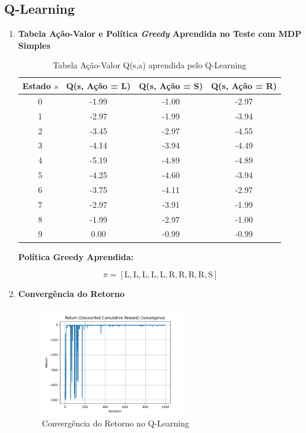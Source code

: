 \documentclass[a4paper,12pt]{article}
\begin{document}
\subsection{Q-Learning}
\begin{enumerate}[label=2.2.\arabic*.]
    \item \textbf{Tabela Ação-Valor e Política \textit{Greedy} Aprendida no Teste com MDP Simples}\\
    
    \begin{table}[h!]
    \centering
    \caption{Tabela Ação-Valor Q(s,a) aprendida pelo Q-Learning}
    \begin{tabular}{|c|c|c|c|}
    \hline
    \textbf{Estado $s$} & \textbf{Q(s, Ação = L)} & \textbf{Q(s, Ação = S)} & \textbf{Q(s, Ação = R)} \\
    \hline
    0 & -1.99 & -1.00 & -2.97 \\
    1 & -2.97 & -1.99 & -3.94 \\
    2 & -3.45 & -2.97 & -4.55 \\
    3 & -4.14 & -3.94 & -4.49 \\
    4 & -5.19 & -4.89 & -4.89 \\
    5 & -4.25 & -4.60 & -3.94 \\
    6 & -3.75 & -4.11 & -2.97 \\
    7 & -2.97 & -3.91 & -1.99 \\
    8 & -1.99 & -2.97 & -1.00 \\
    9 &  0.00 & -0.99 & -0.99 \\
    \hline
    \end{tabular}
    \end{table}

    \vspace{0.3cm}

    \noindent\textbf{Política Greedy Aprendida:}

    \[
    \pi = [\text{L}, \text{L}, \text{L}, \text{L}, \text{L}, \text{R}, \text{R}, \text{R}, \text{R}, \text{S}]
    \]
    
    \item \textbf{Convergência do Retorno}\\
    \begin{figure}[!h]
    \centering
    \includegraphics[width=0.6\textwidth]{q-learning/return_convergence.png}
    \caption{Convergência do Retorno no Q-Learning}


\end{figure}
\end{enumerate}
\end{document}
